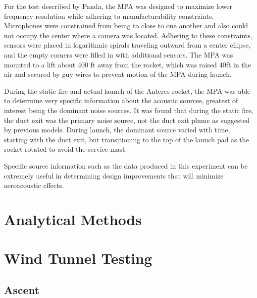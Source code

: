 \documentclass[]{aiaa-tc}%
\begin{document}
For the test described by Panda, the MPA was designed to maximize lower frequency resolution while adhering to manufacturability constraints.  Microphones were constrained from being to close to one another and also could not occupy the center where a camera was located.  Adhering to these constraints, sensors were placed in logarithmic spirals traveling outward from a center ellipse, and the empty corners were filled in with additional sensors.  The MPA was mounted to a lift about 400 ft away from the rocket, which was raised 40ft in the air and secured by guy wires to prevent motion of the MPA during launch.

During the static fire and actual launch of the Anteres rocket, the MPA was able to determine very specific information about the acoustic sources, greatest of interest being the dominant noise sources.  It was found that during the static fire, the duct exit was the primary noise source, not the duct exit plume as suggested by previous models.  During launch, the dominant source varied with time, starting with the duct exit, but transitioning to the top of the launch pad as the rocket rotated to avoid the service mast.

Specific source information such as the data produced in this experiment can be extremely useful in determining design improvements that will minimize aeroacoustic effects.






\section{Analytical Methods}




\section{Wind Tunnel Testing}


\subsection{Ascent}
\end{document}
